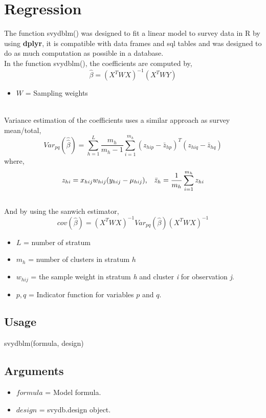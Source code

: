 
\newpage
\section{Regression}
The function {\ttfamily svydblm()} was designed to fit a linear model to survey data in {\sf R} by using {\bf dplyr}, it is compatible with data frames and sql tables and was designed to do as much computation as possible in a database.\\

In the function {\ttfamily svydblm()}, the coefficients are computed by,
$$\hat{\beta} = (X^TWX)^{-1}(X^TWY)$$
\begin{itemize}
\item $W$ = Sampling weights
\end{itemize}
\\
Variance estimation of the coefficients uses a similar approach as survey mean/total,
$$Var_{pq}(\hat{\hat{\beta}}) =  \sum_{h = 1}^{L} \frac{m_h}{m_h - 1} 
                    \sum_{i = 1}^{m_h} (z_{hip} - \bar{z}_{hp})^T (z_{hiq} - \bar{z}_{hq})$$
where,
$$z_{hi} = x_{hij} w_{hij} (y_{hij} - \mu_{hij}) 
\text{,\quad} 
\bar{z}_h = \frac{1}{m_h} \sum_{i = 1}^{m_h} z_{hi}$$
\\
And by using the sanwich estimator,
$$cov(\hat{\beta}) =  (X^TWX)^{-1}Var_{pq}(\hat{\beta})(X^TWX)^{-1}$$

\begin{itemize}
\item $L$ = number of stratum

\item $m_h$ = number of clusters in stratum $h$

\item $w_{hij}$ = the sample weight in stratum {\emph h} and cluster {\emph i} for observation {\emph j}.

\item $p,q$ = Indicator function for variables $p$ and $q$.
\end{itemize}

\subsection{Usage}
\begin{center}
    {\ttfamily svydblm(formula, design)}
\end{center}
\subsection{Arguments}
\begin{itemize}
\item $formula$ = Model formula.

\item $design$ = svydb.design object.
\end{itemize}

